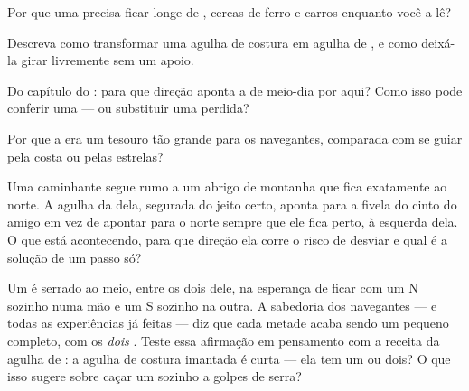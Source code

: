 \begin{exercise}[$\star$]\label{exo:g4:magnets-and-compass:6}
Por que uma  precisa ficar longe de , cercas de ferro e
carros enquanto você a lê?
\end{exercise}

\begin{exercise}[$\star$]\label{exo:g4:magnets-and-compass:7}
Descreva como transformar uma agulha de costura em agulha de ,
e como deixá-la girar livremente sem um apoio.
\end{exercise}

\begin{exercise}[$\star$]\label{exo:g4:magnets-and-compass:8}
Do capítulo do : para que direção aponta a  de
meio-dia por aqui? Como isso pode conferir uma  --- ou
substituir uma  perdida?
\end{exercise}

\begin{exercise}[$\star$]\label{exo:g4:magnets-and-compass:9}
Por que a  era um tesouro tão grande para os navegantes,
comparada com se guiar pela costa ou pelas estrelas?
\end{exercise}

\begin{exercise}[$\star\star$]\label{exo:g4:magnets-and-compass:10}
Uma caminhante segue rumo a um abrigo de montanha que fica
exatamente ao norte. A agulha da  dela, segurada do jeito
certo, aponta para a fivela do cinto do amigo em vez de apontar para
o norte sempre que ele fica perto, à esquerda dela. O que está
acontecendo, para que direção ela corre o risco de desviar e qual é a
solução de um passo só?
\end{exercise}

\begin{exercise}[$\star\star$]\label{exo:g4:magnets-and-compass:11}
Um  é serrado ao meio, entre os dois  dele, na esperança de
ficar com um N sozinho numa mão e um S sozinho na outra. A sabedoria
dos navegantes --- e todas as experiências já feitas --- diz que cada
metade acaba sendo um pequeno  completo, com os \emph{dois} .
Teste essa afirmação em pensamento com a receita da agulha de
: a agulha de costura imantada é curta --- ela tem um  ou
dois? O que isso sugere sobre caçar um  sozinho a golpes de
serra?
\end{exercise}
